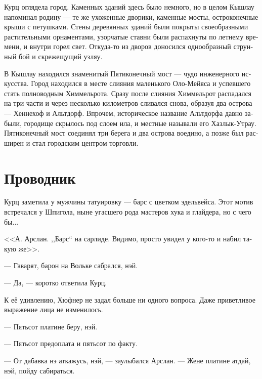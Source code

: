 \documentclass[a4paper,12pt,fleqn]{book}\usepackage{polyglossia}\setdefaultlanguage[babelshorthands=true]{russian}\setotherlanguage{english}\defaultfontfeatures{Ligatures=TeX,Mapping=tex-text}\usepackage{xcolor}\newcommand{\ml}[3]{#2}
\begin{document}
Курц оглядела город.
Каменных зданий здесь было немного, но в целом Кышлау напоминал родину --- те же ухоженные дворики, каменные мосты, остроконечные крыши с петушками.
Стены деревянных зданий были покрыты своеобразными растительными орнаментами, узорчатые ставни были распахнуты по летнему времени, и внутри горел свет.
Откуда-то из дворов доносился однообразный струнный бой и скрежещущий узляу.

\ml{$0$}
{В Кышлау находился знаменитый Пятиконечный мост --- чудо инженерного искусства.}
{Qyschlau housed the famous Five-pointed Bridge, an engineering marvel.}
\ml{$0$}
{Город находился в месте слияния маленького Оло-Мейяса и успевшего стать полноводным Химмельрота.}
{The town was located at the confluence of little Olo-Mej\o{}s and already flooding Himmelrot.}
Сразу после слияния Химмельрот распадался на три части и через несколько километров сливался снова, образуя два острова --- Хеннехоф и Альтдорф.
\ml{$0$}
{Впрочем, историческое название Альтдорфа давно забыли, городище скрылось под слоем ила, и местные называли его Хазлык-Утрау.}
{However, the historical name of Altdorf was forgotten long ago, the burg was hidden under sludge, and locals called the island Ha\dh{}lyq-Utrau.}
Пятиконечный мост соединял три берега и два острова воедино, а позже был расширен и стал городским центром торговли.

\section{Проводник}

Курц заметила у мужчины татуировку --- барс с цветком эдельвейса.
Этот мотив встречался у Шпигола, ныне угасшего рода мастеров хука и глайдера, но с чего бы...

<<А.
Арслан.
,,Барс`` на сарлиде.
Видимо, просто увидел у кого-то и набил такую же>>.

--- Гаварят, барон на Вольке сабрался, нэй.

--- Да, --- коротко ответила Курц.

К её удивлению, Хюфнер не задал больше ни одного вопроса.
Даже приветливое выражение лица не изменилось.

--- Пятьсот платине беру, нэй.

--- Пятьсот предоплата и пятьсот по факту.

--- От дабавка нэ аткажусь, нэй, --- заулыбался Арслан.
--- Жене платине атдай, нэй, пойду сабираться.
\end{document}
